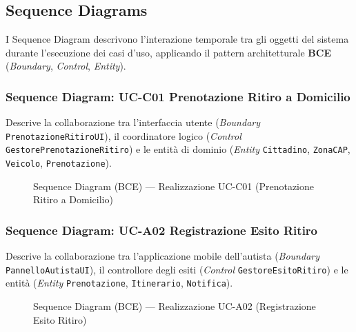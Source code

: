 \newpage
\subsection{Sequence Diagrams}
I Sequence Diagram descrivono l'interazione temporale tra gli oggetti del sistema durante l'esecuzione dei casi d'uso, applicando il pattern architetturale \textbf{BCE} (\textit{Boundary}, \textit{Control}, \textit{Entity}).

\clearpage
\subsubsection{Sequence Diagram: UC-C01 Prenotazione Ritiro a Domicilio}
Descrive la collaborazione tra l'interfaccia utente (\textit{Boundary} \texttt{PrenotazioneRitiroUI}), il coordinatore logico (\textit{Control} \texttt{GestorePrenotazioneRitiro}) e le entità di dominio (\textit{Entity} \texttt{Cittadino}, \texttt{ZonaCAP}, \texttt{Veicolo}, \texttt{Prenotazione}).

\begin{figure}[htbp]
    \centering
    \caption{Sequence Diagram (BCE) --- Realizzazione UC-C01 (Prenotazione Ritiro a Domicilio)}
    \label{fig:seq_ritiro}
\end{figure}

\clearpage
\subsubsection{Sequence Diagram: UC-A02 Registrazione Esito Ritiro}
Descrive la collaborazione tra l'applicazione mobile dell'autista (\textit{Boundary} \texttt{PannelloAutistaUI}), il controllore degli esiti (\textit{Control} \texttt{GestoreEsitoRitiro}) e le entità (\textit{Entity} \texttt{Prenotazione}, \texttt{Itinerario}, \texttt{Notifica}).

\begin{figure}[htbp]
    \centering
    \caption{Sequence Diagram (BCE) --- Realizzazione UC-A02 (Registrazione Esito Ritiro)}
    \label{fig:seq_esito}
\end{figure}

